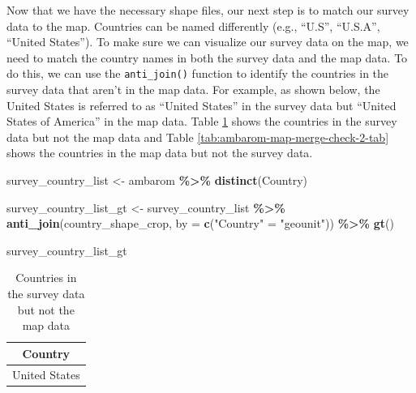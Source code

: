 \documentclass[
]{krantz}
\makeatletter
\newenvironment{Shaded}{\begin{snugshade}}{\end{snugshade}}
\newcommand{\AttributeTok}[1]{\textcolor[rgb]{0.27,0.27,0.27}{#1}}
\newcommand{\FunctionTok}[1]{\textcolor[rgb]{0.27,0.27,0.27}{\textbf{#1}}}
\newcommand{\NormalTok}[1]{#1}
\newcommand{\OtherTok}[1]{\textcolor[rgb]{0.37,0.37,0.37}{#1}}
\newcommand{\SpecialCharTok}[1]{\textcolor[rgb]{0.43,0.43,0.43}{\textbf{#1}}}
\newcommand{\StringTok}[1]{\textcolor[rgb]{0.5,0.5,0.5}{#1}}
\newenvironment{kframe}{%
\medskip{}
\setlength{\fboxsep}{.8em}
 \def\at@end@of@kframe{}%
 \ifinner\ifhmode%
  \def\at@end@of@kframe{\end{minipage}}%
  \begin{minipage}{\columnwidth}%
 \fi\fi%
 \def\FrameCommand##1{\hskip\@totalleftmargin \hskip-\fboxsep
 \colorbox{shadecolor}{##1}\hskip-\fboxsep
     \hskip-\linewidth \hskip-\@totalleftmargin \hskip\columnwidth}%
 \MakeFramed {\advance\hsize-\width
   \@totalleftmargin\z@ \linewidth\hsize
   \@setminipage}}%
 {\par\unskip\endMakeFramed%
 \at@end@of@kframe}
\renewenvironment{Shaded}{\begin{kframe}}{\end{kframe}}
\makeatother
\begin{document}
Now that we have the necessary shape files, our next step is to match our survey data to the map. Countries can be named differently (e.g., ``U.S'', ``U.S.A'', ``United States''). To make sure we can visualize our survey data on the map, we need to match the country names in both the survey data and the map data. To do this, we can use the \texttt{anti\_join()} function to identify the countries in the survey data that aren't in the map data. For example, as shown below, the United States is referred to as ``United States'' in the survey data but ``United States of America'' in the map data. Table \ref{tab:ambarom-map-merge-check-1-tab} shows the countries in the survey data but not the map data and Table \ref{tab:ambarom-map-merge-check-2-tab} shows the countries in the map data but not the survey data.

\begin{Shaded}
\begin{Highlighting}[]
\NormalTok{survey\_country\_list }\OtherTok{\textless{}{-}}\NormalTok{ ambarom }\SpecialCharTok{\%\textgreater{}\%} \FunctionTok{distinct}\NormalTok{(Country)}

\NormalTok{survey\_country\_list\_gt }\OtherTok{\textless{}{-}}\NormalTok{ survey\_country\_list }\SpecialCharTok{\%\textgreater{}\%}
  \FunctionTok{anti\_join}\NormalTok{(country\_shape\_crop, }\AttributeTok{by =} \FunctionTok{c}\NormalTok{(}\StringTok{"Country"} \OtherTok{=} \StringTok{"geounit"}\NormalTok{)) }\SpecialCharTok{\%\textgreater{}\%}
  \FunctionTok{gt}\NormalTok{()}
\end{Highlighting}
\end{Shaded}

\begin{Shaded}
\begin{Highlighting}[]
\NormalTok{survey\_country\_list\_gt}
\end{Highlighting}
\end{Shaded}



\begin{longtable}{c}
\caption{\label{tab:ambarom-map-merge-check-1-tab}Countries in the survey data but not the map data}\\
\toprule
Country \\ 
\midrule
United States \\ 
\bottomrule
\end{longtable}
\end{document}
